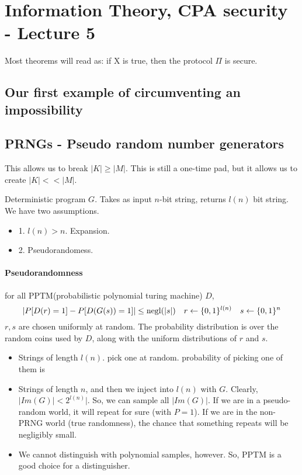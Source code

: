 \chapter{Information Theory, CPA security - Lecture 5}


Most theorems will read as: if X is true, then the protocol $\Pi$ is secure.

\section{Our first example of circumventing an impossibility}

\section{PRNGs - Pseudo random number generators}
This allows us to break $|K| \geq |M|$.
This is still a one-time pad, but it allows us to create $|K| << |M|$.


Deterministic program $G$.  Takes as input $n$-bit string, returns $l(n)$ bit string. We have two
assumptions.
\begin{itemize}
\item 1. $l(n) > n$. Expansion.
\item 2. Pseudorandomess.
\end{itemize}

\subsubsection{Pseudorandomness}
for all PPTM(probabilistic polynomial turing machine) $D$,
$$ |P[D(r) = 1] - P[D(G(s)) = 1]| \leq \operatorname{negl}(|s|) \quad  r \leftarrow \{0, 1\}^{l(n)} \quad  s \leftarrow \{0, 1\}^n$$
$r, s$ are chosen uniformly at random. The probability distribution is over the
random coins used by $D$, along with the uniform distributions of $r$ and $s$.


\begin{itemize}
\item Strings of length $l(n)$. pick one at random. probability of picking one of them is
\item Strings of length $n$, and then we inject into $l(n)$ with $G$. Clearly, $|Im(G)| < 2^{l(n)}|$.
So, we can sample all $|Im(G)|$. If we are in a pseudo-random world, it will repeat for sure (with $P = 1$).
If we are in the non-PRNG world (true randomness), the chance that something repeats will be negligibly small.
\item We cannot distinguish with polynomial samples, however. So, PPTM is a good choice for a distinguisher.
\end{itemize}


